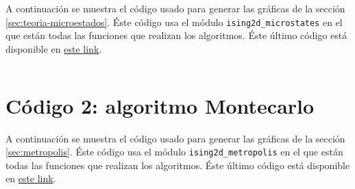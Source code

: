 \documentclass[%
 reprint,
 amsmath,amssymb,
 aps,
 pra,
]{revtex4-2}
\begin{document}
A continuación se muestra el código usado para generar las gráficas de la sección \ref{sec:teoria-microestados}. Éste código usa el módulo \texttt{ising2d_microstates} en el que están todas las funciones que realizan los algoritmos. Éste último código está disponible en \href{https://github.com/jearistiz/Statistical-Physics-Projects/blob/master/3/ising2d_microstates.py}{este link}.

\inputminted[linenos,breaklines]{python}{code_1.py}

\section{Código 2: algoritmo Montecarlo\label{appx:montecarlo}}

A continuación se muestra el código usado para generar las gráficas de la sección \ref{sec:metropolis}. Éste código usa el módulo \texttt{ising2d_metropolis} en el que están todas las funciones que realizan los algoritmos. Éste último código está disponible en \href{https://github.com/jearistiz/Statistical-Physics-Projects/blob/master/3/ising2d_metropolis.py}{este link}.

\inputminted[linenos,breaklines]{python}{code_2.py}
\end{document}
